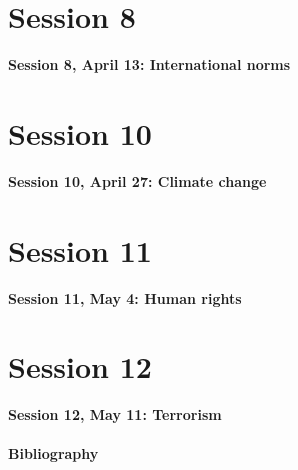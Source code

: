 \documentclass[a4paper,11pt]{article}
\begin{document}
\newpage
\part{Session 8}
\textbf{Session 8, April 13: International norms}



\newpage
\part{Session 10}
\textbf{Session 10, April 27: Climate change}



\newpage
\part{Session 11}
\textbf{Session 11, May 4: Human rights}



\newpage
\part{Session 12}
\textbf{Session 12, May 11: Terrorism}





\newpage
\subsection*{\Large Bibliography}
\printbibliography[type=book, title={\large Books}]
\printbibliography[type=article, title={\large Articles}]


\end{document}
